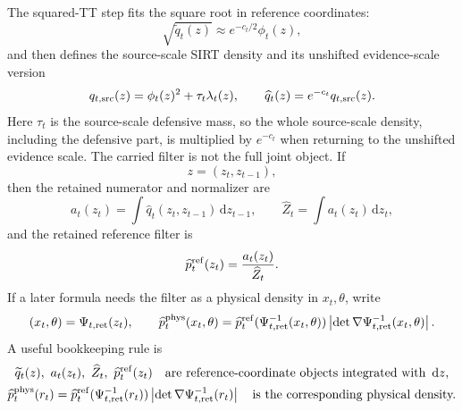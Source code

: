 \documentclass[11pt]{article}
\numberwithin{equation}{section}
\newcommand{\dd}{\,\mathrm d}
\begin{document}
The squared-TT step fits the square root in reference coordinates:
\begin{equation}
    \sqrt{\widetilde q_t(z)}
    \approx
    e^{-c_t/2}\phi_t(z),
    \label{eq:p25-walk-5}
\end{equation}
	and then defines the source-scale SIRT density and its unshifted
	evidence-scale version
\begin{equation}
    q_{t,{\rm src}}(z)
    =
    \phi_t(z)^2+\tau_t\lambda_t(z),
    \qquad
    \widehat q_t(z)
    =
    e^{-c_t}q_{t,{\rm src}}(z).
    \label{eq:p25-walk-6}
\end{equation}
Here \(\tau_t\) is the source-scale defensive mass, so the whole
source-scale density, including the defensive part, is multiplied by
\(e^{-c_t}\) when returning to the unshifted evidence scale.
The carried filter is not the full joint object.  If
\begin{equation}
    z=(z_t,z_{t-1}),
    \label{eq:p25-walk-7}
\end{equation}
then the retained numerator and normalizer are
\begin{equation}
    a_t(z_t)
    =
    \int\widehat q_t(z_t,z_{t-1})\dd z_{t-1},
    \qquad
    \widehat Z_t
    =
    \int a_t(z_t)\dd z_t,
    \label{eq:p25-walk-8}
\end{equation}
and the retained reference filter is
\begin{equation}
    \widehat p_t^{\rm ref}(z_t)
    =
    \frac{a_t(z_t)}{\widehat Z_t}.
    \label{eq:p25-walk-9}
\end{equation}
If a later formula needs the filter as a physical density in \(x_t,\theta\),
write
\begin{equation}
    (x_t,\theta)=\Psi_{t,\rm ret}(z_t),
    \qquad
    \widehat p_t^{\rm phys}(x_t,\theta)
    =
    \widehat p_t^{\rm ref}(\Psi_{t,\rm ret}^{-1}(x_t,\theta))
    \left|\det\nabla\Psi_{t,\rm ret}^{-1}(x_t,\theta)\right|.
    \label{eq:p25-walk-10}
\end{equation}
A useful bookkeeping rule is
\begin{equation}
\begin{gathered}
    \widetilde q_t(z),\ a_t(z_t),\ \widehat Z_t,\ 
    \widehat p_t^{\rm ref}(z_t)
    \quad\text{are reference-coordinate objects integrated with } \dd z,\\
    \widehat p_t^{\rm phys}(r_t)
    =
    \widehat p_t^{\rm ref}(\Psi_{t,\rm ret}^{-1}(r_t))
    \left|\det\nabla\Psi_{t,\rm ret}^{-1}(r_t)\right|
    \quad\text{is the corresponding physical density.}
\end{gathered}
    \label{eq:p25-walk-measure-bookkeeping}
\end{equation}
\end{document}
